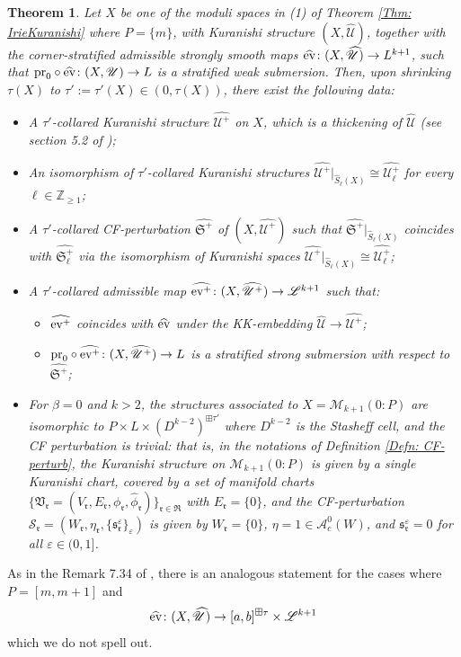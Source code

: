 \documentclass[10pt]{amsart}
\numberwithin{equation}{section}
\theoremstyle{plain}
\newtheorem{theorem}{Theorem}[section]
\theoremstyle{definition}
\theoremstyle{remark}
\numberwithin{equation}{section}
\newcommand{\Z}{\mathbb{Z}}
\newcommand{\ev}{\textup{ev}}
\newcommand{\wh}[1]{\widehat{#1}}
\newcommand{\mf}[1]{\mathfrak{#1}}
\newcommand{\ms}[1]{\mathscr{#1}}
\newcommand{\pr}{\textup{pr}}
\begin{document}
{\begin{theorem}\label{Thm: ExistCF} 
	Let $X$ be one of the moduli spaces in (1) of  Theorem \ref{Thm: IrieKuranishi} where $P=\{m\}$, with Kuranishi structure $(X,\wh{\mathscr{U}})$, together with the corner-stratified admissible strongly smooth maps $\wh{\ev} \colon (X,\wh{\ms{U}})\to L^{k+1}$, such that $\pr_0\circ \wh{\ev}\colon (X,\mathscr{U})\to L$ is a stratified weak submersion.  Then, upon shrinking $\tau(X)$ to $\tau':=\tau'(X)\in (0,\tau(X))$, there exist the following data:
	\begin{itemize}
		\item A $\tau'$-collared Kuranishi structure $\wh{\mathscr{U}^+}$ on $X$, which is a thickening of $\wh{\mathscr{U}}$ (see section 5.2 of \cite{FOOO20book});
		\item An isomorphism of $\tau'$-collared Kuranishi structures $\wh{\ms{U}^+}|_{\wh{S}_\ell (X)}\cong \wh{\ms{U}_\ell^+}$ for every $\ell \in \Z_{\geq 1}$;
		\item A $\tau'$-collared CF-perturbation $\wh{\mf{S}^+}$ of $(X,\wh{\ms{U}^+})$ such that $\wh{\mf{S}^+}|_{\wh{S}_\ell(X)}$ coincides with $\wh{\mf{S}^+_\ell}$ via the isomorphism of Kuranishi spaces $\wh{\ms{U}^+}|_{\wh{S}_\ell(X)}\cong \wh{\ms{U}_\ell^+}$;
		\item A $\tau'$-collared admissible map $\wh{\ev^+}\colon (X,\wh{\ms{U}^+})\to \ms{L}^{k+1}$ such that: 
		\begin{itemize}
			\item $\wh{\ev^+}$ coincides with $\wh{\ev}$ under the KK-embedding $\wh{\ms{U}}\to \wh{\ms{U}^+}$;
			\item $\pr_0\circ \wh{\ev^+}\colon (X,\wh{\ms{U}^+})\to L$ is a stratified strong submersion with respect to $\wh{\mf{S}^+}$;
		\end{itemize}
			\item For $\beta=0$ and $k>2$, the structures associated to $X=\ms{M}_{k+1}(0:P)$ are isomorphic to $P\times L \times (D^{k-2})^{\boxplus \tau'}$ where $D^{k-2}$ is the Stasheff cell, and  the CF perturbation is trivial: that is, in the notations of Definition \ref{Defn: CF-perturb}, the Kuranishi structure on $\ms{M}_{k+1}(0:P)$ is given by a single Kuranishi chart, covered by a set of manifold charts $\{\mf{V}_\mf{r}=(V_\mf{r}, E_\mf{r}, \phi_\mf{r}, \wh{\phi}_\mf{r})\}_{\mf{r}\in\mf{R}}$ with $E_\mf{r}=\{0\}$, and the CF-perturbation $\ms{S}_\mf{r}=(W_\mf{r},\eta_\mf{r},\{\mf{s}_\mf{r}^\varepsilon\}_\varepsilon)$ is given by $W_\mf{r}=\{0\}$,  $\eta=1\in \ms{A}_c^0(W)$, and $\mf{s}_\mf{r}^\varepsilon=0$ for all $\varepsilon\in(0,1]$.
	\end{itemize}
\end{theorem}
As in the  Remark 7.34 of \cite{Irie2}, there is an analogous statement for the cases where $P=[m,m+1]$ and \[ \wh{\ev}\colon (X,\wh{\mathscr{U}})\to [a,b]^{\boxplus \tau}\times \mathscr{L}^{k+1}  \]which we do not spell out.


}
\end{document}
